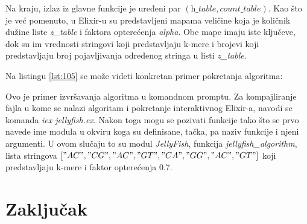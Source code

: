\documentclass[12pt,oneside]{memoir}
\begin{document}
Na kraju, izlaz iz glavne funkcije je uređeni par $(\textit{h\_table}, \textit{count\_table})$. Kao što je već pomenuto, u Elixir-u su predstavljeni mapama veličine koja je količnik dužine liste \textit{z\_table} i faktora opterećenja \textit{alpha}. Obe mape imaju iste ključeve, dok su im vrednosti stringovi koji predstavljaju k-mere i brojevi koji predstavljaju broj pojavljivanja određenog stringa u listi \textit{z\_table}.

Na listingu \ref{lst:105} se može videti konkretan primer pokretanja algoritma:



\newpage

Ovo je primer izvršavanja algoritma u komandnom promptu. Za kompajliranje fajla u kome se nalazi algoritam i pokretanje interaktivnog Elixir-a, navodi se komanda \textit{iex jellyfish.ex}. Nakon toga mogu se pozivati funkcije tako što se prvo navede ime modula u okviru koga su definisane, tačka, pa naziv funkcije i njeni argumenti. U ovom slučaju to su modul \textit{JellyFish}, funkcija \textit{jellyfish\_algorithm}, lista stringova $["AC", "CG", "AC", "GT", "CA","GG", "AC","GT"]$ koji predstavljaju k-mere i faktor opterećenja 0.7.


\chapter{Zaključak}


\literatura

\backmatter
\end{document}
